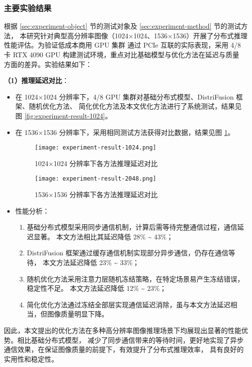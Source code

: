 \subsubsection{主要实验结果}
\label{sec:main-experiment-result}
\par
根据 \ref{sec:experiment-object} 节的测试对象及 \ref{sec:experiment-method} 节的测试方法，
本研究针对典型高分辨率图像（1024×1024、1536×1536）开展了分布式推理性能评估。为验证低成本商用 GPU 集群
通过 PCIe 互联的实际表现，采用 4/8 卡 RTX 4090 GPU 构建测试环境，重点对比基础模型与优化方法在延迟与质量
方面的差异。实验结果如下：
\par
\textbf{（1）推理延迟对比}：
\begin{itemize}
    \item 在 1024×1024 分辨率下，4/8 GPU 集群对基础分布式模型、DistriFusion 框架、随机优化方法、
    简化优化方法及本文优化方法进行了系统测试，结果见图 \ref{fig:experiment-result-1024}。
    \item 在 1536×1536 分辨率下，采用相同测试方法获得对比数据，结果见图 \ref{fig:experiment-result-2048}。
    
    \begin{figure}[ht]
        \centering
        \begin{minipage}[t]{0.45\linewidth}
            \centering
            \texttt{[image: experiment-result-1024.png]}
            \caption{1024×1024 分辨率下各方法推理延迟对比}
            \label{fig:experiment-result-1024}
        \end{minipage}
        \hfill
        \begin{minipage}[t]{0.45\linewidth}
            \centering
            \texttt{[image: experiment-result-2048.png]}
            \caption{1536×1536 分辨率下各方法推理延迟对比}
            \label{fig:experiment-result-2048}
        \end{minipage}
    \end{figure}
    
    \item 性能分析：
    \begin{enumerate}
        \item 基础分布式模型采用同步通信机制，计算后需等待完整通信过程，通信延迟显著。
        本文方法相比其延迟降低 28\% \~{} 43\%；
        \item DistriFusion 框架通过缓存通信机制实现部分异步通信，仍存在通信等待，
        本文方法延迟降低 23\% \~{} 33\%；
        \item 随机优化方法采用注意力层随机冻结策略，在特定场景易产生冻结错误，稳定性不足。
        本文方法延迟降低 12\% \~{} 23\%；
        \item 简化优化方法通过冻结全部层实现通信延迟消除，虽与本文方法延迟相当，但图像质量明显下降。
    \end{enumerate}
\end{itemize}
\par
因此，本文提出的优化方法在多种高分辨率图像推理场景下均展现出显著的性能优势。相比基础分布式模型，
减少了同步通信带来的等待时间，更好地实现了异步通信效果，在保证图像质量的前提下，有效提升了分布式推理效率，
具有良好的实用性和稳定性。

